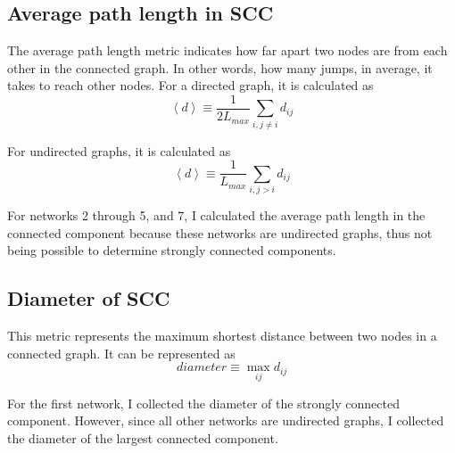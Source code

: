 \subsection{Average path length in SCC}
The average path length metric indicates how far apart two nodes are from each other in the connected graph. In other words, how many jumps, in average, it takes to reach other nodes. For a directed graph, it is calculated as
\begin{equation}
    \left\langle d \right\rangle \equiv \frac{1}{2L_{max}}\sum_{i,j \neq i}d_{ij}
    \label{equation:dir_avg_path_len}
\end{equation}

For undirected graphs, it is calculated as
\begin{equation}
    \left\langle d \right\rangle \equiv \frac{1}{L_{max}}\sum_{i,j >  i}d_{ij}
    \label{equation:undir_avg_path_len}
\end{equation}

For networks 2 through 5, and 7, I calculated the average path length in the connected component because these networks are undirected graphs, thus not being possible to determine strongly connected components.

\subsection{Diameter of SCC}
This metric represents the maximum shortest distance between two nodes in a connected graph. It can be represented as
\begin{equation}
    diameter \equiv \max_{ij}d_{ij}
    \label{equation:diameter}
\end{equation}

For the first network, I collected the diameter of the strongly connected component. However, since all other networks are undirected graphs, I collected the diameter of the largest connected component.

